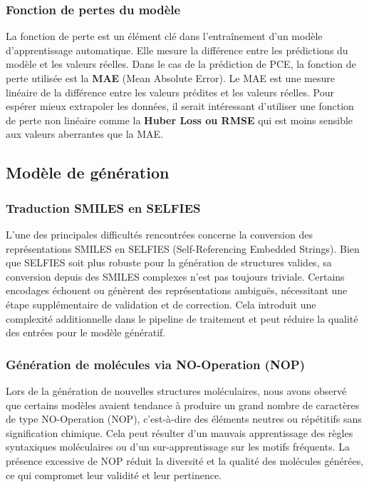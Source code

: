 \subsubsection{Fonction de pertes du modèle}
La fonction de perte est un élément clé dans l'entraînement d'un modèle d'apprentissage automatique.
Elle mesure la différence entre les prédictions du modèle et les valeurs réelles.
Dans le cas de la prédiction de PCE, la fonction de perte utilisée est la \textbf{MAE} (Mean Absolute Error).
Le MAE est une mesure linéaire de la différence entre les valeurs prédites et les valeurs réelles.
Pour espérer mieux extrapoler les données, il serait intéressant d'utiliser une fonction de perte non linéaire comme la \textbf{Huber Loss ou RMSE} qui est moins sensible aux valeurs aberrantes que la MAE.

\subsection{Modèle de génération}

\subsubsection{Traduction SMILES en SELFIES}

L'une des principales difficultés rencontrées concerne la conversion des représentations SMILES en SELFIES (Self-Referencing Embedded Strings). Bien que SELFIES soit plus robuste pour la génération de structures valides, sa conversion depuis des SMILES complexes n’est pas toujours triviale. Certains encodages échouent ou génèrent des représentations ambiguës, nécessitant une étape supplémentaire de validation et de correction. Cela introduit une complexité additionnelle dans le pipeline de traitement et peut réduire la qualité des entrées pour le modèle génératif.

\subsubsection{Génération de molécules via NO-Operation (NOP)}

Lors de la génération de nouvelles structures moléculaires, nous avons observé que certains modèles avaient tendance à produire un grand nombre de caractères de type NO-Operation (NOP), c’est-à-dire des éléments neutres ou répétitifs sans signification chimique. Cela peut résulter d’un mauvais apprentissage des règles syntaxiques moléculaires ou d’un sur-apprentissage sur les motifs fréquents. La présence excessive de NOP réduit la diversité et la qualité des molécules générées, ce qui compromet leur validité et leur pertinence.
